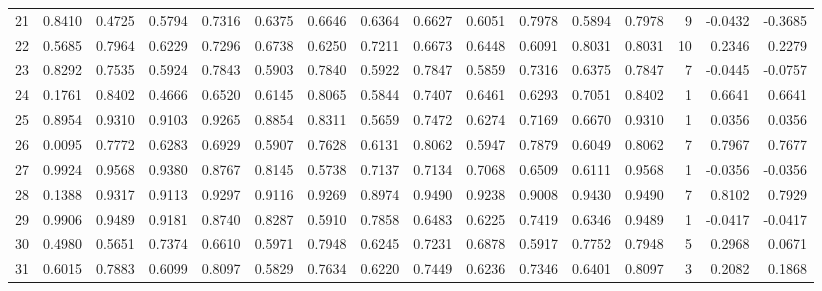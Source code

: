 \begin{tabular}{lrrrrrrrrrrrrrrr}
21  &      0.8410 &  0.4725 &  0.5794 &  0.7316 &  0.6375 &  0.6646 &  0.6364 &  0.6627 &  0.6051 &  0.7978 &   0.5894 &     0.7978 &      9 &                   -0.0432 &                    -0.3685 \\
22  &      0.5685 &  0.7964 &  0.6229 &  0.7296 &  0.6738 &  0.6250 &  0.7211 &  0.6673 &  0.6448 &  0.6091 &   0.8031 &     0.8031 &     10 &                    0.2346 &                     0.2279 \\
23  &      0.8292 &  0.7535 &  0.5924 &  0.7843 &  0.5903 &  0.7840 &  0.5922 &  0.7847 &  0.5859 &  0.7316 &   0.6375 &     0.7847 &      7 &                   -0.0445 &                    -0.0757 \\
24  &      0.1761 &  0.8402 &  0.4666 &  0.6520 &  0.6145 &  0.8065 &  0.5844 &  0.7407 &  0.6461 &  0.6293 &   0.7051 &     0.8402 &      1 &                    0.6641 &                     0.6641 \\
25  &      0.8954 &  0.9310 &  0.9103 &  0.9265 &  0.8854 &  0.8311 &  0.5659 &  0.7472 &  0.6274 &  0.7169 &   0.6670 &     0.9310 &      1 &                    0.0356 &                     0.0356 \\
26  &      0.0095 &  0.7772 &  0.6283 &  0.6929 &  0.5907 &  0.7628 &  0.6131 &  0.8062 &  0.5947 &  0.7879 &   0.6049 &     0.8062 &      7 &                    0.7967 &                     0.7677 \\
27  &      0.9924 &  0.9568 &  0.9380 &  0.8767 &  0.8145 &  0.5738 &  0.7137 &  0.7134 &  0.7068 &  0.6509 &   0.6111 &     0.9568 &      1 &                   -0.0356 &                    -0.0356 \\
28  &      0.1388 &  0.9317 &  0.9113 &  0.9297 &  0.9116 &  0.9269 &  0.8974 &  0.9490 &  0.9238 &  0.9008 &   0.9430 &     0.9490 &      7 &                    0.8102 &                     0.7929 \\
29  &      0.9906 &  0.9489 &  0.9181 &  0.8740 &  0.8287 &  0.5910 &  0.7858 &  0.6483 &  0.6225 &  0.7419 &   0.6346 &     0.9489 &      1 &                   -0.0417 &                    -0.0417 \\
30  &      0.4980 &  0.5651 &  0.7374 &  0.6610 &  0.5971 &  0.7948 &  0.6245 &  0.7231 &  0.6878 &  0.5917 &   0.7752 &     0.7948 &      5 &                    0.2968 &                     0.0671 \\
31  &      0.6015 &  0.7883 &  0.6099 &  0.8097 &  0.5829 &  0.7634 &  0.6220 &  0.7449 &  0.6236 &  0.7346 &   0.6401 &     0.8097 &      3 &                    0.2082 &                     0.1868 \\

\end{tabular}
